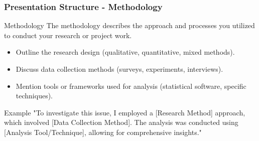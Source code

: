\documentclass{beamer}
\begin{document}
\begin{frame}[fragile]
    \frametitle{Presentation Structure - Methodology}
    \begin{block}{Methodology}
        The methodology describes the approach and processes you utilized to conduct your research or project work.
    \end{block}
    \begin{itemize}
        \item Outline the research design (qualitative, quantitative, mixed methods).
        \item Discuss data collection methods (surveys, experiments, interviews).
        \item Mention tools or frameworks used for analysis (statistical software, specific techniques).
    \end{itemize}
    \begin{exampleblock}{Example}
        "To investigate this issue, I employed a [Research Method] approach, which involved [Data Collection Method]. The analysis was conducted using [Analysis Tool/Technique], allowing for comprehensive insights."
    \end{exampleblock}
\end{frame}
\end{document}
